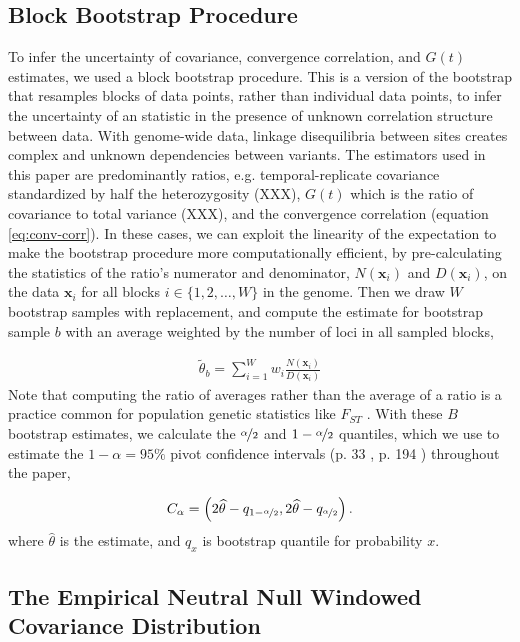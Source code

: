 \documentclass[11pt]{article}
\begin{document}
\subsection{Block Bootstrap Procedure}
\label{supp:block-bootstrap}

To infer the uncertainty of covariance, convergence correlation, and $G(t)$
estimates, we used a block bootstrap procedure. This is a version of the
bootstrap that resamples blocks of data points, rather than individual data
points, to infer the uncertainty of an statistic in the presence of unknown
correlation structure between data. With genome-wide data, linkage
disequilibria between sites creates complex and unknown dependencies between
variants. The estimators used in this paper are predominantly ratios, e.g.
temporal-replicate covariance standardized by half the heterozygosity (XXX),
$G(t)$ which is the ratio of covariance to total variance (XXX), and the
convergence correlation (equation \eqref{eq:conv-corr}). In these cases, we can
exploit the linearity of the expectation to make the bootstrap procedure more
computationally efficient, by pre-calculating the statistics of the ratio's
numerator and denominator, $N(\mathbf{x}_i)$ and $D(\mathbf{x}_i)$, on the data
$\mathbf{x}_i$ for all blocks $i \in \{1, 2, \ldots, W\}$ in the genome. Then
we draw $W$ bootstrap samples with replacement, and compute the estimate for
bootstrap sample $b$ with an average weighted by the number of loci in all
sampled blocks, 

\begin{align}
  \tilde{\theta}_b = \sum_{i=1}^W w_i \frac{N(\mathbf{x}_i)}{D(\mathbf{x}_i)}
\end{align}
%
Note that computing the ratio of averages rather than the average of a ratio is
a practice common for population genetic statistics like $F_{ST}$
\parencite{Bhatia2013-zy}. With these $B$ bootstrap estimates, we calculate the
$\nicefrac{\alpha}{2}$ and $1-\nicefrac{\alpha}{2}$ quantiles, which we use to
estimate the $1-\alpha = 95\%$ pivot confidence intervals (p. 33
\cite{Wasserman2006-jl}, p. 194 \cite{Davison2013-oy}) throughout the paper,

\begin{align}
  C_\alpha = \left(2 \widehat{\theta} - q_{1-\nicefrac{\alpha}{2}}, 2 \widehat{\theta} - q_{\nicefrac{\alpha}{2}} \right).
\end{align}
%
where $\widehat{\theta}$ is the estimate, and $q_x$ is bootstrap quantile for
probability $x$.

\subsection{The Empirical Neutral Null Windowed Covariance Distribution}
\label{supp:empirical-null}
\end{document}
